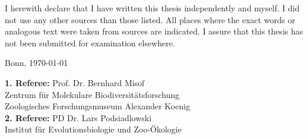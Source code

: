 \thispagestyle{empty}

I herewith declare that I have written this thesis independently and myself. I
did not use any other sources than those listed. All places where the exact
words or analogous text were taken from sources are indicated. I assure that
this thesis has not been submitted for examination elsewhere.

\vspace{4em}

\parbox[t]{0.3\textwidth}{\dotfill}

Bonn, \today

\myself

\vfill

\noindent
\textbf{1. Referee:} Prof. Dr. Bernhard Misof\\
Zentrum für Molekulare Biodiversitätsforschung\\
Zoologisches Forschungsmuseum Alexander Koenig\\

\noindent
\textbf{2. Referee:} PD Dr. Lars Podsiadlowski\\
Institut für Evolutionsbiologie und Zoo-Ökologie
